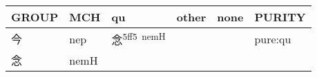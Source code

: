 \documentclass[14pt,a4paper]{scrartcl}
\begin{document}
\begin{longtable}[c]{@{}llllll@{}}
\toprule
\begin{minipage}[b]{0.14\columnwidth}\raggedright\strut
GROUP
\strut\end{minipage} &
\begin{minipage}[b]{0.14\columnwidth}\raggedright\strut
MCH
\strut\end{minipage} &
\begin{minipage}[b]{0.14\columnwidth}\raggedright\strut
qu
\strut\end{minipage} &
\begin{minipage}[b]{0.14\columnwidth}\raggedright\strut
other
\strut\end{minipage} &
\begin{minipage}[b]{0.14\columnwidth}\raggedright\strut
none
\strut\end{minipage} &
\begin{minipage}[b]{0.14\columnwidth}\raggedright\strut
PURITY
\strut\end{minipage}\tabularnewline
\midrule
\endhead
\begin{minipage}[t]{0.14\columnwidth}\raggedright\strut
今
\strut\end{minipage} &
\begin{minipage}[t]{0.14\columnwidth}\raggedright\strut
nep
\strut\end{minipage} &
\begin{minipage}[t]{0.14\columnwidth}\raggedright\strut
念\textsuperscript{5ff5~nemH}
\strut\end{minipage} &
\begin{minipage}[t]{0.14\columnwidth}\raggedright\strut
\strut\end{minipage} &
\begin{minipage}[t]{0.14\columnwidth}\raggedright\strut
\strut\end{minipage} &
\begin{minipage}[t]{0.14\columnwidth}\raggedright\strut
pure:qu
\strut\end{minipage}\tabularnewline
\begin{minipage}[t]{0.14\columnwidth}\raggedright\strut
念
\strut\end{minipage} &
\begin{minipage}[t]{0.14\columnwidth}\raggedright\strut
nemH
\strut\end{minipage} &
\begin{minipage}[t]{0.14\columnwidth}\raggedright\strut
\strut\end{minipage} &
\begin{minipage}[t]{0.14\columnwidth}\raggedright\strut

\end{minipage}
\end{longtable}
\end{document}
